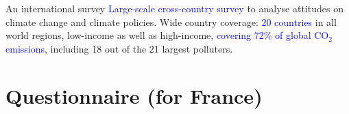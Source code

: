 \begin{frame}{An international survey}
\bbvs
\ip \textcolor{blue}{Large-scale cross-country survey} to analyse attitudes on climate change and climate policies.
\ip Wide country coverage:
\bbvs
\ip \textcolor{blue}{20 countries} in all world regions, low-income as well as high-income, 
\ip \textcolor{blue}{covering 72\% of global CO$_\text{2}$ emissions}, including 18 out of the 21 largest polluters.
\ee
\ee
{}
\end{frame}

\section{Questionnaire (for France)}


